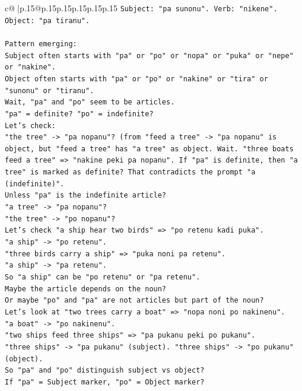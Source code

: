 \documentclass{article}
\begin{document}
{\begin{supertabular}{c@{$\;$}|p{.15\linewidth}@{}p{.15\linewidth}p{.15\linewidth}p{.15\linewidth}p{.15\linewidth}p{.15\linewidth}}
{{{\texttt{Subject: "pa sunonu". Verb: "nikene". Object: "pa tiranu".} \\
\\ 
\texttt{Pattern emerging:} \\
\texttt{Subject often starts with "pa" or "po" or "nopa" or "puka" or "nepe" or "nakine".} \\
\texttt{Object often starts with "pa" or "po" or "nakine" or "tira" or "sunonu" or "tiranu".} \\
\texttt{Wait, "pa" and "po" seem to be articles.} \\
\texttt{"pa" = definite? "po" = indefinite?} \\
\texttt{Let's check:} \\
\texttt{"the tree" {-}> "pa nopanu"? (from "feed a tree" {-}> "pa nopanu" is object, but "feed a tree" has "a tree" as object. Wait. "three boats feed a tree" => "nakine peki pa nopanu". If "pa" is definite, then "a tree" is marked as definite? That contradicts the prompt "a (indefinite)".} \\
\texttt{Unless "pa" is the indefinite article?} \\
\texttt{"a tree" {-}> "pa nopanu"?} \\
\texttt{"the tree" {-}> "po nopanu"?} \\
\texttt{Let's check "a ship hear two birds" => "po retenu kadi puka".} \\
\texttt{"a ship" {-}> "po retenu".} \\
\texttt{"three birds carry a ship" => "puka noni pa retenu".} \\
\texttt{"a ship" {-}> "pa retenu".} \\
\texttt{So "a ship" can be "po retenu" or "pa retenu".} \\
\texttt{Maybe the article depends on the noun?} \\
\texttt{Or maybe "po" and "pa" are not articles but part of the noun?} \\
\texttt{Let's look at "two trees carry a boat" => "nopa noni po nakinenu".} \\
\texttt{"a boat" {-}> "po nakinenu".} \\
\texttt{"two ships feed three ships" => "pa pukanu peki po pukanu".} \\
\texttt{"three ships" {-}> "pa pukanu" (subject). "three ships" {-}> "po pukanu" (object).} \\
\texttt{So "pa" and "po" distinguish subject vs object?} \\
\texttt{If "pa" = Subject marker, "po" = Object marker?} \\
}}}
\end{supertabular}}
\end{document}
